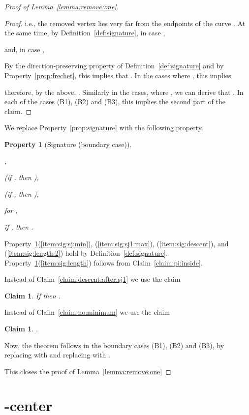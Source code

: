 \documentclass[11pt, letter]{article}
\newtheorem{claim}[theorem]{Claim}
\newtheorem{property}[]{Property}
\newcommand{\lemref}[1]{Lemma~\ref{lemma:#1}}
\newcommand{\defref}[1]{Definition~\ref{def:#1}}
\newcommand{\claimref}[1]{Claim~\ref{claim:#1}}
\newcommand{\proplab}[1]{\label{prop:#1}}
\newcommand{\propref}[1]{Property~\ref{prop:#1}}
\begin{document}
\begin{proof}[Proof of \lemref{remove:one}]
\begin{proof}
i.e., the removed vertex  lies very far from the endpoints of
the curve . At the same time, by \defref{signature},
in case ,
 
and, in case ,

By the direction-preserving property of \defref{signature} and by
\propref{frechet}, this implies that .
In the cases where , this implies
 
therefore, by the above, .
Similarly in the cases, where , 
we can derive that .
In each of the cases (B1), (B2) and (B3), this implies the second part of the claim.
\end{proof}

We replace \propref{signature} with the following property. 
\begin{property}[Signature (boundary case)]
\mbox{}
\begin{compactenum}[(i)]
\item ,
\item  
      (if , then ),
\item  
      (if , then ),
\item  for ,
\item if , then .
\end{compactenum}
\proplab{signature:boundary}
\end{property}

\propref{signature:boundary}(\ref{item:sig:sj:min}), (\ref{item:sig:sj1:max}), 
(\ref{item:sig:descent}), and (\ref{item:sig:length:2}) hold by \defref{signature}.
\propref{signature:boundary}(\ref{item:sig:length}) follows from
\claimref{pi:inside}.

Instead of \claimref{descent:after:sj1} we use the claim
\begin{claim}
If  then
.
\end{claim}

Instead of \claimref{no:minimum} we use the claim
\begin{claim}
.
\end{claim}

Now, the theorem follows in the boundary cases (B1), (B2) and (B3), by replacing
 with  and replacing  with .




This closes the proof of \lemref{remove:one}
\end{proof}




\section{-center}
\end{document}
